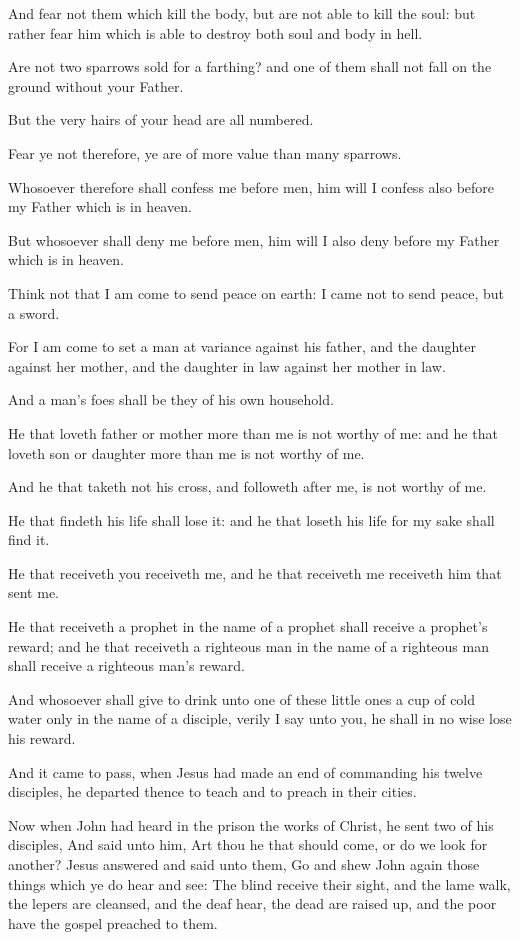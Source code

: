 \Verse And fear not them which kill the body, but are not able to kill the soul: but rather fear him which is able to destroy both soul and body in hell.

\Verse Are not two sparrows sold for a farthing? and one of them shall not fall on the ground without your Father.

\Verse But the very hairs of your head are all numbered.

\Verse Fear ye not therefore, ye are of more value than many sparrows.

\Verse Whosoever therefore shall confess me before men, him will I confess also before my Father which is in heaven.

\Verse But whosoever shall deny me before men, him will I also deny before my Father which is in heaven.

\Verse Think not that I am come to send peace on earth: I came not to send peace, but a sword.

\Verse For I am come to set a man at variance against his father, and the daughter against her mother, and the daughter in law against her mother in law.

\Verse And a man's foes shall be they of his own household.

\Verse He that loveth father or mother more than me is not worthy of me: and he that loveth son or daughter more than me is not worthy of me.

\Verse And he that taketh not his cross, and followeth after me, is not worthy of me.

\Verse He that findeth his life shall lose it: and he that loseth his life for my sake shall find it.

\Verse He that receiveth you receiveth me, and he that receiveth me receiveth him that sent me.

\Verse He that receiveth a prophet in the name of a prophet shall receive a prophet's reward; and he that receiveth a righteous man in the name of a righteous man shall receive a righteous man's reward.

\Verse And whosoever shall give to drink unto one of these little ones a cup of cold water only in the name of a disciple, verily I say unto you, he shall in no wise lose his reward.


\Chapter
\Verse And it came to pass, when Jesus had made an end of commanding his twelve disciples, he departed thence to teach and to preach in their cities.

\Verse Now when John had heard in the prison the works of Christ, he sent two of his disciples, \Verse And said unto him, Art thou he that should come, or do we look for another?  \Verse Jesus answered and said unto them, Go and shew John again those things which ye do hear and see: \Verse The blind receive their sight, and the lame walk, the lepers are cleansed, and the deaf hear, the dead are raised up, and the poor have the gospel preached to them.

